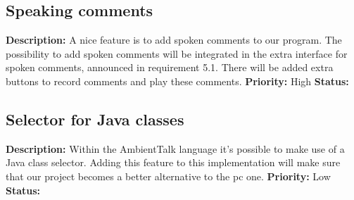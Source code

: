 \documentclass{article}
\begin{document}
\subsection{Speaking comments}
\textbf{Description: } A nice feature is to add spoken comments to our program. The possibility to add spoken comments will be integrated in the
extra interface for spoken comments, announced in requirement 5.1. There will be added extra buttons to record comments and play these comments.\newline
\textbf{Priority:} High \newline
\textbf{Status: } \newline
\subsection{Selector for Java classes}
\textbf{Description: } Within the AmbientTalk language it's possible to make use of a Java class selector. Adding this feature to this implementation
will make sure that our project becomes a better alternative to the pc one.\newline
\textbf{Priority:} Low \newline
\textbf{Status: } \newline
\end{document}
